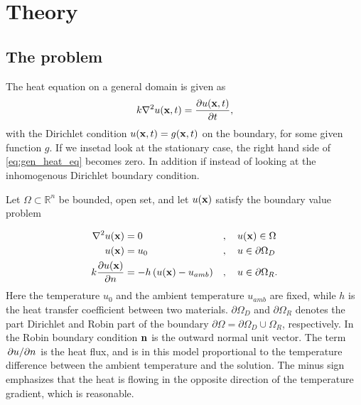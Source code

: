 \section{Theory}
\subsection{The problem}
The heat equation on a general domain is given as
\begin{equation}
	k\laplacian{u(\vb{x},t)} = \pdv{u(\vb{x},t)}{t}
	\label{eq:gen_heat_eq},
\end{equation}
with the Dirichlet condition $u(\vb{x},t) = g(\vb{x},t)$ on the boundary, for some given function $g$. If we insetad look at the stationary case, the right hand side of \eqref{eq:gen_heat_eq} becomes zero. In addition if instead of looking at the inhomogenous Dirichlet boundary condition.

Let $\Omega \subset \mathbb{R}^n$ be bounded, open set, and let $u(\vb{x})$ satisfy the boundary value problem 

\begin{alignat}{3}
	\laplacian{u(\vb{x})} &= 0 &&,\quad u(\vb{x}) \in \Omega \\
	u(\vb{x}) &= u_0 &&,\quad u \in \partial\Omega_D \\
	k\pdv{u(\vb{x})}{n} &= -h\left(u(\vb{x}) - u_{amb} \right) &&, \quad u \in \partial\Omega_R.
	\label{eq:heat_bvp}
\end{alignat}
Here the temperature $u_0$ and the ambient temperature $u_{amb}$ are fixed, while $h$ is the heat transfer coefficient between two materials. $\partial\Omega_D$ and $\partial\Omega_R$ denotes the part Dirichlet and Robin part of the boundary $\partial\Omega = \partial\Omega_D\cup\Omega_R$, respectively. In the Robin boundary condition  $\vb{n}$ is the outward normal unit vector. The term $\pdv*{u}{n}$ is the heat flux, and is in this model proportional to the temperature difference between the ambient temperature and the solution. The minus sign emphasizes that the heat is flowing in the opposite direction of the temperature gradient, which is reasonable.

